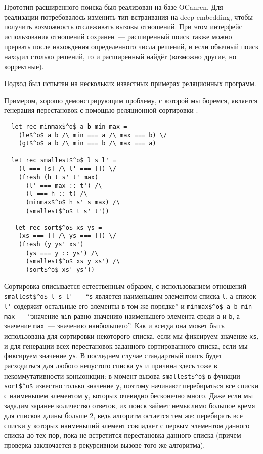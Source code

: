     Прототип расширенного поиска был реализован на базе OCanren. Для реализации потребовалось изменить тип встраивания на deep embedding, чтобы получить возможность отслеживать вызовы отношений. При этом интерфейс использования отношений сохранен~--- расширенный поиск также можно прервать после нахождения определенного числа решений, и если обычный поиск находил столько решений, то и расширенный найдёт (возможно другие, но корректные).

    Подход был испытан на нескольких известных примерах реляционных программ.
    
    Примером, хорошо демонстрирующим проблему, с которой мы боремся, является генерация перестановок с помощью реляционной сортировки \cite{ocanren}.
    
\begin{lstlisting}
  let rec minmax$^o$ a b min max =
    (le$^o$ a b /\ min === a /\ max === b) \/
    (gt$^o$ a b /\ min === b /\ max === a)
  
  let rec smallest$^o$ l s l' =
    (l === [s] /\ l' === []) \/
    (fresh (h t s' t' max)
      (l' === max :: t') /\
      (l === h :: t) /\
      (minmax$^o$ h s' s max) /\
      (smallest$^o$ t s' t'))
   
   let rec sort$^o$ xs ys =
    (xs === [] /\ ys === []) \/
    (fresh (y ys' xs')
      (ys === y :: ys') /\
      (smallest$^o$ xs y xs') /\
      (sort$^o$ xs' ys'))
\end{lstlisting}

    Сортировка описывается естественным образом, с использованием отношений \lstinline|smallest$^o$ l s l'|~--- ``\lstinline|s| является наименьшим элементом списка \lstinline|l|, а список \lstinline|l'| содержит остальные его элементы в том же порядке'' и \lstinline|minmax$^o$ a b min max|~--- ``значение \lstinline|min| равно значению наименьшего элемента среди \lstinline|a| и \lstinline|b|, а значение \lstinline|max|~--- значению наибольшего''. Как и всегда она может быть использована для сортировки некоторого списка, если мы фиксируем значение \lstinline|xs|, и для генерации всех перестановок заданного сортированного списка, если мы фиксируем значение \lstinline|ys|. В последнем случае стандартный поиск будет расходиться для любого непустого списка \lstinline|ys| и причина здесь тоже в некоммутативности конъюнкции: в момент вызова \lstinline|smallest$^o$| в функции \lstinline|sort$^o$| известно только значение \lstinline|y|, поэтому начинают перебираться все списки с наименьшем элементом \lstinline|y|, которых очевидно бесконечно много. Даже если мы зададим заранее количество ответов, их поиск займет немыслимо большое время для списков длины больше $2$, ведь алгоритм остается тем же: перебирать все списки у которых наименьший элемент совпадает с первым элементом данного списка до тех пор, пока не встретится перестановка данного списка (причем проверка заключается в рекурсивном вызове того же алгоритма).
  
